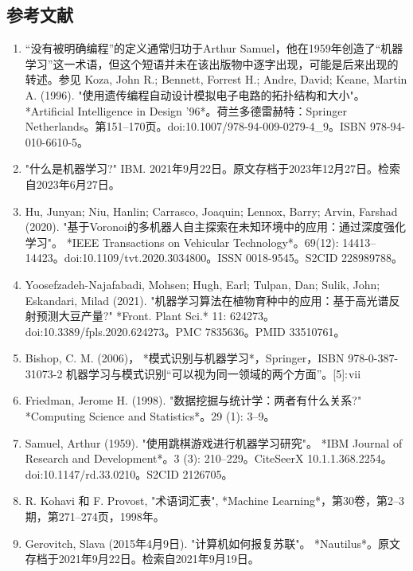 \subsection{参考文献}  
\begin{enumerate}
\item “没有被明确编程”的定义通常归功于Arthur Samuel，他在1959年创造了“机器学习”这一术语，但这个短语并未在该出版物中逐字出现，可能是后来出现的转述。参见 Koza, John R.; Bennett, Forrest H.; Andre, David; Keane, Martin A. (1996). "使用遗传编程自动设计模拟电子电路的拓扑结构和大小"。 *Artificial Intelligence in Design '96*。荷兰多德雷赫特：Springer Netherlands。第151–170页。doi:10.1007/978-94-009-0279-4_9。ISBN 978-94-010-6610-5。  
\item "什么是机器学习?" IBM. 2021年9月22日。原文存档于2023年12月27日。检索自2023年6月27日。  
\item Hu, Junyan; Niu, Hanlin; Carrasco, Joaquin; Lennox, Barry; Arvin, Farshad (2020). "基于Voronoi的多机器人自主探索在未知环境中的应用：通过深度强化学习"。 *IEEE Transactions on Vehicular Technology*。69(12): 14413–14423。doi:10.1109/tvt.2020.3034800。ISSN 0018-9545。S2CID 228989788。  
\item Yoosefzadeh-Najafabadi, Mohsen; Hugh, Earl; Tulpan, Dan; Sulik, John; Eskandari, Milad (2021). "机器学习算法在植物育种中的应用：基于高光谱反射预测大豆产量?" *Front. Plant Sci.* 11: 624273。doi:10.3389/fpls.2020.624273。PMC 7835636。PMID 33510761。  
\item Bishop, C. M. (2006)， *模式识别与机器学习*，Springer，ISBN 978-0-387-31073-2  
  机器学习与模式识别“可以视为同一领域的两个方面”。[5]: vii  
\item Friedman, Jerome H. (1998). "数据挖掘与统计学：两者有什么关系?" *Computing Science and Statistics*。29 (1): 3–9。  
\item Samuel, Arthur (1959). "使用跳棋游戏进行机器学习研究"。 *IBM Journal of Research and Development*。3 (3): 210–229。CiteSeerX 10.1.1.368.2254。doi:10.1147/rd.33.0210。S2CID 2126705。  
\item R. Kohavi 和 F. Provost, "术语词汇表", *Machine Learning*，第30卷，第2–3期，第271–274页，1998年。  
\item Gerovitch, Slava (2015年4月9日). "计算机如何报复苏联"。 *Nautilus*。原文存档于2021年9月22日。检索自2021年9月19日。
\end{enumerate}